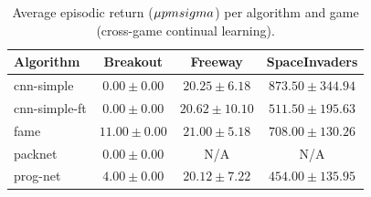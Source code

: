\begin{table}[h]
\centering
\caption{Average episodic return ($\mu \\pm \\sigma$) per algorithm and game (cross-game continual learning).}
\label{tab:eval_results}
\begin{tabular}{lccc}
\toprule
\textbf{Algorithm} & \textbf{Breakout} & \textbf{Freeway} & \textbf{SpaceInvaders} \\
\midrule
cnn-simple & $0.00 \pm 0.00$ & $20.25 \pm 6.18$ & $873.50 \pm 344.94$ \\
cnn-simple-ft & $0.00 \pm 0.00$ & $20.62 \pm 10.10$ & $511.50 \pm 195.63$ \\
fame & $11.00 \pm 0.00$ & $21.00 \pm 5.18$ & $708.00 \pm 130.26$ \\
packnet & $0.00 \pm 0.00$ & N/A & N/A \\
prog-net & $4.00 \pm 0.00$ & $20.12 \pm 7.22$ & $454.00 \pm 135.95$ \\
\bottomrule
\end{tabular}
\end{table}
